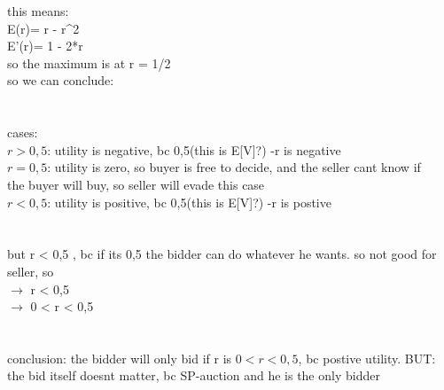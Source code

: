 \documentclass{article}
\begin{document}
this means:\\
E(r)= r - r^2\\
E'(r)= 1 - 2*r\\
so the maximum is at r = 1/2\\


so we can conclude:\\

\\\\
cases:\\
$r > 0,5$:  utility is negative, bc 0,5(this is E[V]?) -r is negative\\
$r = 0,5$:  utility is zero, so buyer is free to decide, and the seller cant know if\\ the buyer will buy, so seller will evade this case\\
$r < 0,5$: utility is positive, bc 0,5(this is E[V]?) -r is postive\\
\\\\
but r < 0,5 , bc if its 0,5 the bidder can do whatever he wants. so not good for seller, so\\
$\rightarrow$ r < 0,5\\
$\rightarrow$ 0 < r < 0,5\\
\\\\
conclusion: the bidder will only bid if r is $0 < r < 0,5$, bc postive utility.
BUT: the bid itself doesnt matter, bc SP-auction and he is the only bidder
\end{document}
